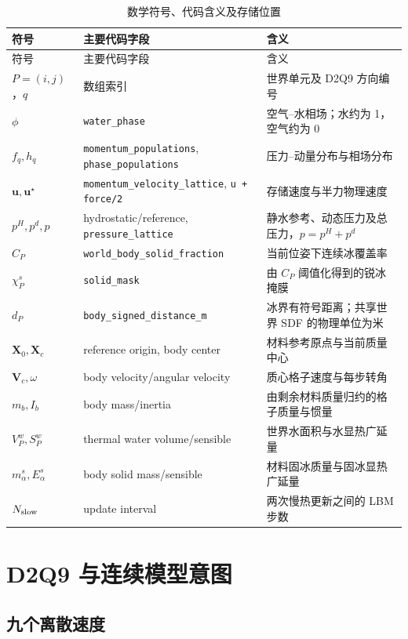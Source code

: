 \documentclass[UTF8,zihao=-4]{ctexart}
\newcommand{\vect}[1]{\boldsymbol{#1}}
\newcommand{\code}[1]{\texttt{#1}}
\numberwithin{equation}{section}
\begin{document}
\begin{longtable}{@{}p{}p{}p{}@{}}
\caption{数学符号、代码含义及存储位置}\label{tab:symbols}\\
\toprule
符号 & 主要代码字段 & 含义 \\
\midrule
\endfirsthead
\toprule
符号 & 主要代码字段 & 含义 \\
\midrule
\endhead
$P=(i,j)$，$q$ & 数组索引 & 世界单元及 D2Q9 方向编号 \\
$\phi$ & \code{water\_phase} & 空气--水相场；水约为 1，空气约为 0 \\
$f_q,h_q$ & \code{momentum\_populations}, \code{phase\_populations} & 压力--动量分布与相场分布 \\
$\vect u,\vect u^\star$ & \code{momentum\_velocity\_lattice}, \code{u + force/2} & 存储速度与半力物理速度 \\
$p^H,p^d,p$ & hydrostatic/reference, \code{pressure\_lattice} & 静水参考、动态压力及总压力，$p=p^H+p^d$ \\
$C_P$ & \code{world\_body\_solid\_fraction} & 当前位姿下连续冰覆盖率 \\
$\chi_P^s$ & \code{solid\_mask} & 由 $C_P$ 阈值化得到的锐冰掩膜 \\
$d_P$ & \code{body\_signed\_distance\_m} & 冰界有符号距离；共享世界 SDF 的物理单位为米 \\
$\vect X_0,\vect X_c$ & reference origin, body center & 材料参考原点与当前质量中心 \\
$\vect V_c,\omega$ & body velocity/angular velocity & 质心格子速度与每步转角 \\
$m_b,I_b$ & body mass/inertia & 由剩余材料质量归约的格子质量与惯量 \\
$V_P^w,S_P^w$ & thermal water volume/sensible & 世界水面积与水显热广延量 \\
$m_\alpha^s,E_\alpha^s$ & body solid mass/sensible & 材料固冰质量与固冰显热广延量 \\
$N_{\rm slow}$ & update interval & 两次慢热更新之间的 LBM 步数 \\
\bottomrule
\end{longtable}

\section{D2Q9 与连续模型意图}

\subsection{九个离散速度}
\end{document}
